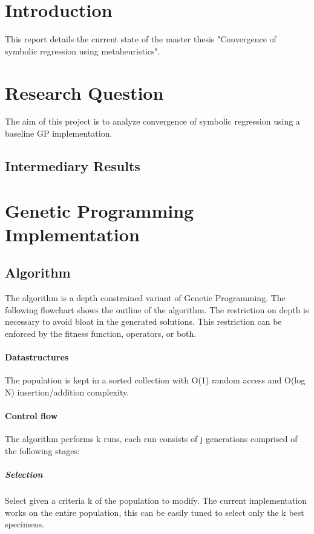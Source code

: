 \documentclass[10pt]{extarticle}
\begin{document}
\maketitle

\section{Introduction}
This report details the current state of the master thesis "Convergence of symbolic regression using metaheuristics".
\section{Research Question}
The aim of this project is to analyze convergence of symbolic regression using a baseline GP implementation. 

\subsection{Intermediary Results}

\section{Genetic Programming Implementation}
\subsection{Algorithm}
The algorithm is a depth constrained variant of Genetic Programming. The following flowchart shows the outline of the algorithm.
The restriction on depth is necessary to avoid bloat in the generated solutions.
This restriction can be enforced by the fitness function, operators, or both.

\paragraph{Datastructures}
The population is kept in a sorted collection with O(1) random access and O(log N) insertion/addition complexity. 

\paragraph{Control flow}
The algorithm performs k runs, each run consists of j generations comprised of the following stages:

\subparagraph{Selection}
Select given a criteria k of the population to modify. The current implementation works on the entire population, this can be easily tuned to select only the k best specimens.
\end{document}
